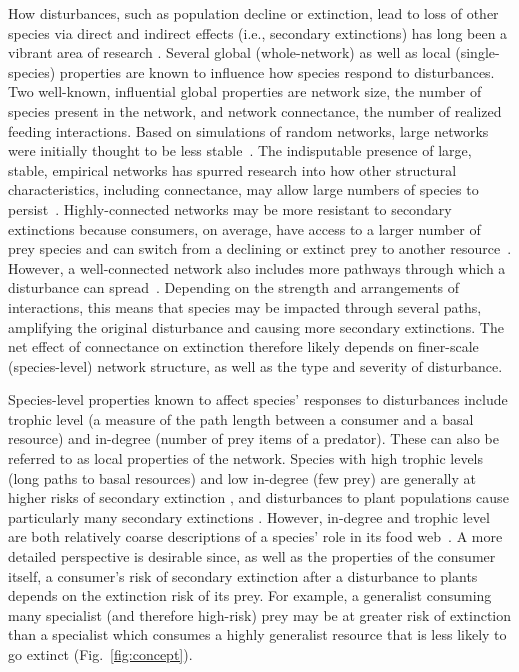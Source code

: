 \documentclass[12pt]{article}
\begin{document}
\begin{spacing}{2.0}
    How disturbances, such as population decline or extinction, lead to loss of other species via direct and indirect effects (i.e., secondary extinctions) has long been a vibrant area of research \citep{Santos2021,curtsdotter2011robustness, dunne2009cascading, Eklof2006}.
    Several global (whole-network) as well as local (single-species) properties are known to influence how species respond to disturbances. Two well-known, influential global properties are network size, the number of species present in the network, and network connectance, the number of realized feeding interactions.
    Based on simulations of random networks, large networks were initially thought to be less stable~\citep{May1972}.
    The indisputable presence of large, stable, empirical networks has spurred research into how other structural characteristics, including connectance, may allow large numbers of species to persist~\citep{Dunne2002}.
    Highly-connected networks may be more resistant to secondary extinctions because consumers, on average, have access to a larger number of prey species and can switch from a declining or extinct prey to another resource~\citep{Dunne2002, Eklof2006,Baumgartner2015}. However, a well-connected network also includes more pathways through which a disturbance can spread~\citep{Dunne2004, Vieira2015}. Depending on the strength and arrangements of interactions, this means that species may be impacted through several paths, amplifying the original disturbance and causing more secondary extinctions.
    The net effect of connectance on extinction therefore likely depends on finer-scale (species-level) network structure, as well as the type and severity of disturbance.
    
    
    Species-level properties known to affect species' responses to disturbances include trophic level (a measure of the path length between a consumer and a basal resource) and in-degree (number of prey items of a predator). 
    These can also be referred to as local properties of the network.
    Species with high trophic levels (long paths to basal resources) and low in-degree (few prey) are generally at higher risks of secondary extinction \citep{binzer2011susceptibility, Eklof2006}, and disturbances to plant populations cause particularly many secondary extinctions \citep{Curtsdotter2011}. %
    However, in-degree and trophic level are both relatively coarse descriptions of a species' role in its food web~\citep{Cirtwill2018FoodWebs}. 
    A more detailed perspective is desirable since, as well as the properties of the consumer itself, a consumer's risk of secondary extinction after a disturbance to plants depends on the extinction risk of its prey.
    For example, a generalist consuming many specialist (and therefore high-risk) prey may be at greater risk of extinction than a specialist which consumes a highly generalist resource that is less likely to go extinct (Fig.~\ref{fig:concept}).



\end{spacing}
\end{document}
